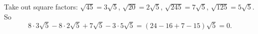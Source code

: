 Take out square factors: $\sqrt{45}=3\sqrt5$, $\sqrt{20}=2\sqrt5$, $\sqrt{245}=7\sqrt5$, $\sqrt{125}=5\sqrt5$. So
\[
8\cdot3\sqrt5-8\cdot2\sqrt5+7\sqrt5-3\cdot5\sqrt5=(24-16+7-15)\sqrt5=\boxed{0}.
\]
